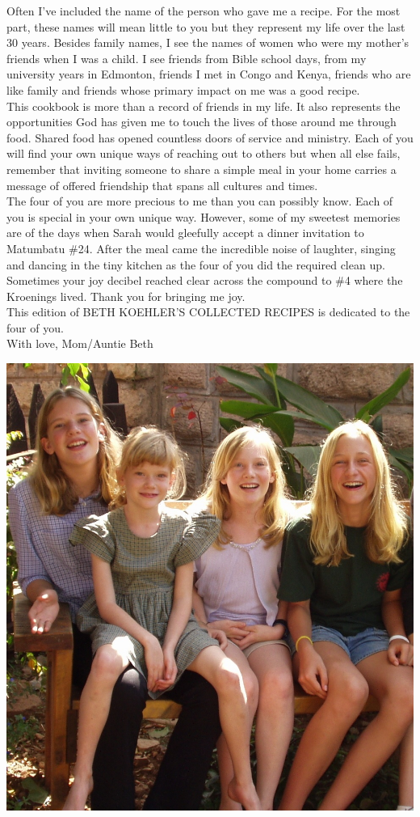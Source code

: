 \documentclass[11pt]{memoir} %
\begin{document}
Often I've included the name of the person who gave me a recipe. For the most part, these names will mean little to you but they represent my life over the last 30 years. Besides family names, I see the names of women who were my mother's friends when I was a child. I see friends from Bible school days, from my university years in Edmonton, friends I met in Congo and Kenya, friends who are like family and friends whose primary impact on me was a good recipe. \\[10pt]
This cookbook is more than a record of friends in my life. It also represents the opportunities God has given me to touch the lives of those around me through food. Shared food has opened countless doors of service and ministry. Each of you will find your own unique ways of reaching out to others but when all else fails, remember that inviting someone to share a simple meal in your home carries a message of offered friendship that spans all cultures and times. \\[10pt]
The four of you are more precious to me than you can possibly know. Each of you is special in your own unique way. However, some of my sweetest memories are of the days when Sarah would gleefully accept a dinner invitation to Matumbatu \#24. After the meal came the incredible noise of laughter, singing and dancing in the tiny kitchen as the four of you did the required clean up. Sometimes your joy decibel reached clear across the compound to \#4 where the Kroenings lived. Thank you for bringing me joy. \\[10pt]
This edition of BETH KOEHLER'S COLLECTED RECIPES is dedicated to the four of you. \\[10pt]
\hspace{0.5\linewidth}With love, Mom/Auntie Beth

\centerline{\includegraphics[width=0.75\linewidth]{Girls.jpg}}
\end{document}
